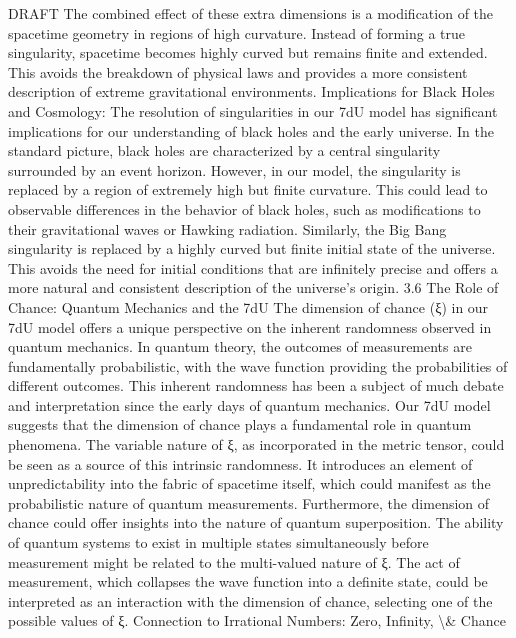 \documentclass[12pt]{article}
\begin{document}
DRAFT
The combined eﬀect of these extra dimensions is a modiﬁcation of the spacetime geometry in
regions of high curvature. Instead of forming a true singularity, spacetime becomes highly curved
but remains ﬁnite and extended. This avoids the breakdown of physical laws and provides a more
consistent description of extreme gravitational environments.
Implications for Black Holes and Cosmology:
The resolution of singularities in our 7dU model has signiﬁcant implications for our understanding of
black holes and the early universe. In the standard picture, black holes are characterized by a
central singularity surrounded by an event horizon. However, in our model, the singularity is
replaced by a region of extremely high but ﬁnite curvature. This could lead to observable diﬀerences
in the behavior of black holes, such as modiﬁcations to their gravitational waves or Hawking
radiation.
Similarly, the Big Bang singularity is replaced by a highly curved but ﬁnite initial state of the
universe. This avoids the need for initial conditions that are inﬁnitely precise and oﬀers a more
natural and consistent description of the universe's origin.
3.6 The Role of Chance: Quantum Mechanics and the 7dU
The dimension of chance (ξ) in our 7dU model oﬀers a unique perspective on the inherent
randomness observed in quantum mechanics. In quantum theory, the outcomes of measurements
are fundamentally probabilistic, with the wave function providing the probabilities of diﬀerent
outcomes. This inherent randomness has been a subject of much debate and interpretation since
the early days of quantum mechanics.
Our 7dU model suggests that the dimension of chance plays a fundamental role in quantum
phenomena. The variable nature of ξ, as incorporated in the metric tensor, could be seen as a
source of this intrinsic randomness. It introduces an element of unpredictability into the fabric of
spacetime itself, which could manifest as the probabilistic nature of quantum measurements.
Furthermore, the dimension of chance could oﬀer insights into the nature of quantum superposition.
The ability of quantum systems to exist in multiple states simultaneously before measurement might
be related to the multi-valued nature of ξ. The act of measurement, which collapses the wave
function into a deﬁnite state, could be interpreted as an interaction with the dimension of chance,
selecting one of the possible values of ξ.
Connection to Irrational Numbers:
Zero, Infinity, \textbackslash{}& Chance
\end{document}
